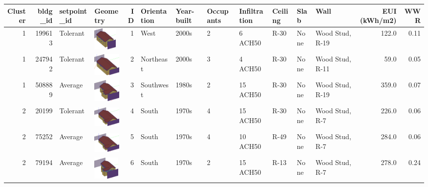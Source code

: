 \begin{tabular}{rrllrlllllllrr}
\toprule
 Cluster & bldg_id & setpoint_id & Geometry & ID & Orientation & Year-built & Occupants & Infiltration & Ceiling & Slab & Wall & EUI (kWh/m2) & WWR \\
\midrule
 1 & 199613 & Tolerant & {\includegraphics[height=0.45in]{figures/building_geometry/199613}} & 1 & West & 2000s & 2 & 6 ACH50 & R-30 & None & Wood Stud, R-19 & 122.0 & 0.11 \\
 1 & 247942 & Tolerant & {\includegraphics[height=0.45in]{figures/building_geometry/247942}} & 2 & Northeast & 2000s & 3 & 4 ACH50 & R-30 & None & Wood Stud, R-11 & 59.0 & 0.05 \\
 1 & 508889 & Average & {\includegraphics[height=0.45in]{figures/building_geometry/508889}} & 3 & Southwest & 1980s & 2 & 15 ACH50 & R-30 & None & Wood Stud, R-19 & 359.0 & 0.07 \\
 2 & 20199 & Tolerant & {\includegraphics[height=0.45in]{figures/building_geometry/20199}} & 4 & South & 1970s & 4 & 15 ACH50 & R-30 & None & Wood Stud, R-7 & 226.0 & 0.06 \\
 2 & 75252 & Average & {\includegraphics[height=0.45in]{figures/building_geometry/75252}} & 5 & South & 1970s & 4 & 10 ACH50 & R-49 & None & Wood Stud, R-7 & 284.0 & 0.06 \\
 2 & 79194 & Average & {\includegraphics[height=0.45in]{figures/building_geometry/79194}} & 6 & South & 1970s & 2 & 15 ACH50 & R-13 & None & Wood Stud, R-7 & 278.0 & 0.24 \\

\end{tabular}
